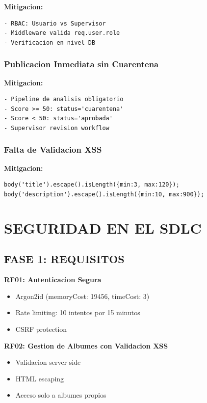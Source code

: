 \documentclass[12pt,a4paper]{article}
\begin{document}
\textbf{Mitigacion:}

\begin{lstlisting}
- RBAC: Usuario vs Supervisor
- Middleware valida req.user.role
- Verificacion en nivel DB
\end{lstlisting}

\subsubsection{Publicacion Inmediata sin Cuarentena}

\textbf{Mitigacion:}

\begin{lstlisting}
- Pipeline de analisis obligatorio
- Score >= 50: status='cuarentena'
- Score < 50: status='aprobada'
- Supervisor revision workflow
\end{lstlisting}

\subsubsection{Falta de Validacion XSS}

\textbf{Mitigacion:}

\begin{lstlisting}
body('title').escape().isLength({min:3, max:120});
body('description').escape().isLength({min:10, max:900});
\end{lstlisting}

\section{SEGURIDAD EN EL SDLC}

\subsection{FASE 1: REQUISITOS}

\textbf{RF01: Autenticacion Segura}
\begin{itemize}
    \item Argon2id (memoryCost: 19456, timeCost: 3)
    \item Rate limiting: 10 intentos por 15 minutos
    \item CSRF protection
\end{itemize}

\textbf{RF02: Gestion de Albumes con Validacion XSS}
\begin{itemize}
    \item Validacion server-side
    \item HTML escaping
    \item Acceso solo a albumes propios
\end{itemize}
\end{document}
